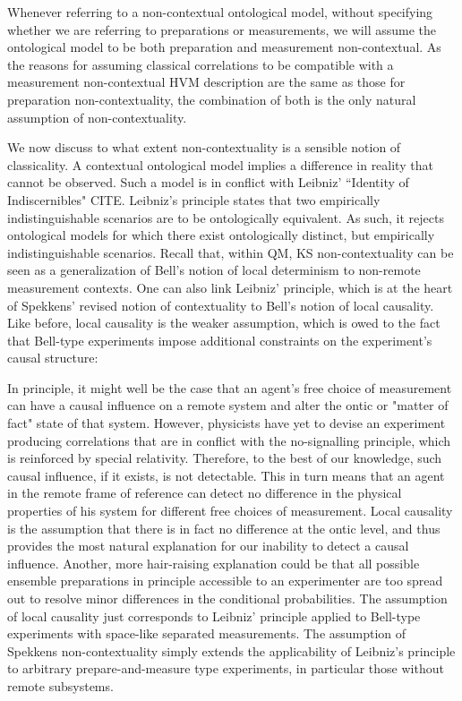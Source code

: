 Whenever referring to a non-contextual ontological model, without specifying whether we are referring to preparations or measurements, we  will assume the ontological model to be both preparation and measurement non-contextual. As the reasons for assuming classical correlations to be compatible with a measurement non-contextual HVM description are the same as those for preparation non-contextuality, the combination of both is the only natural assumption of non-contextuality.

We now discuss to what extent non-contextuality is a sensible notion of classicality. A contextual ontological model implies a difference in reality that cannot be observed. Such a model is in conflict with Leibniz' ``Identity of Indiscernibles" CITE. Leibniz's principle states that two empirically indistinguishable scenarios are to be ontologically equivalent. As such, it rejects ontological models for which there exist ontologically distinct, but empirically indistinguishable scenarios. Recall that, within QM, KS non-contextuality can be seen as a generalization of Bell's notion of local determinism to non-remote measurement contexts. One can also link Leibniz' principle, which is at the heart of Spekkens' revised notion of contextuality to Bell's notion of local causality. Like before, local causality is the weaker assumption, which is owed to the fact that Bell-type experiments impose additional constraints on the experiment's causal structure:

In principle, it might well be the case that an agent's free choice of measurement can have a causal influence on a remote system and alter the ontic or "matter of fact" state of that system. However, physicists have yet to devise an experiment producing correlations that are in conflict with the no-signalling principle, which is reinforced by special relativity. Therefore, to the best of our knowledge, such causal influence, if it exists, is not detectable. This in turn means that an agent in the remote frame of reference can detect no difference in the physical properties of his system for different free choices of measurement. Local causality is the assumption that there is in fact no difference at the ontic level, and thus provides the most natural explanation for our inability to detect a causal influence. Another, more hair-raising explanation could be that all possible ensemble preparations in principle accessible to an experimenter are too spread out to resolve minor differences in the conditional probabilities. The assumption of local causality just corresponds to Leibniz' principle applied to Bell-type experiments with space-like separated measurements. The assumption of Spekkens non-contextuality simply extends the applicability of Leibniz's principle to arbitrary prepare-and-measure type experiments, in particular those without remote subsystems.

